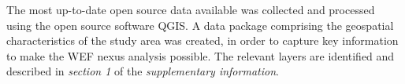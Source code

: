 
The most up-to-date open source data available was collected and processed using the open source software QGIS. A data package comprising the geospatial characteristics of the study area was created, in order to capture key information to make the WEF nexus analysis possible. The relevant layers are identified and described in \textit{section 1} of the \textit{supplementary information}.


